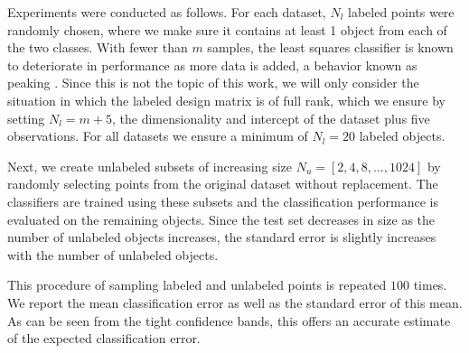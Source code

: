 \documentclass{elsarticle}
\begin{document}
Experiments were conducted as follows. For each dataset, $N_l$ labeled points were randomly chosen, where we make sure it contains at least 1 object from each of the two classes.  With fewer than $m$ samples, the least squares classifier is known to deteriorate in performance as more data is added, a behavior known as peaking \cite{Raudys1998,Opper1996}. Since this is not the topic of this work, we will only consider the situation in which the labeled design matrix is of full rank, which we ensure by setting $N_l=m+5$, the dimensionality and intercept of the dataset plus five observations. For all datasets we ensure a minimum of $N_l=20$ labeled objects.

Next, we create unlabeled subsets of increasing size $N_u=[2,4,8,...,1024]$ by randomly selecting points from the original dataset without replacement. The classifiers are trained using these subsets and the classification performance is evaluated on the remaining objects. Since the test set decreases in size as the number of unlabeled objects increases, the standard error is slightly increases with the number of unlabeled objects.

This procedure of sampling labeled and unlabeled points is repeated $100$ times. We report the mean classification error as well as the standard error of this mean. As can be seen from the tight confidence bands, this offers an accurate estimate of the expected classification error.

\end{document}
